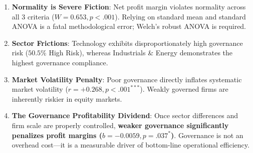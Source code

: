 \documentclass[
]{article}
\providecommand{\tightlist}{%
  \setlength{\itemsep}{0pt}\setlength{\parskip}{0pt}}
\begin{document}
\begin{enumerate}
\def\labelenumi{\arabic{enumi}.}
\tightlist
\item
  \textbf{Normality is Severe Fiction}: Net profit margin violates
  normality across all 3 criteria (\(W = 0.653, p < .001\)). Relying on
  standard mean and standard ANOVA is a fatal methodological error;
  Welch's robust ANOVA is required.
\item
  \textbf{Sector Frictions}: Technology exhibits disproportionately high
  governance risk (\(50.5\%\) High Risk), whereas Industrials \& Energy
  demonstrates the highest governance compliance.
\item
  \textbf{Market Volatility Penalty}: Poor governance directly inflates
  systematic market volatility (\(r = +0.268, p < .001^{***}\)). Weakly
  governed firms are inherently riskier in equity markets.
\item
  \textbf{The Governance Profitability Dividend}: Once sector
  differences and firm scale are properly controlled, \textbf{weaker
  governance significantly penalizes profit margins
  (\(b = -0.0059, p = .037^{*}\))}. Governance is not an overhead
  cost---it is a measurable driver of bottom-line operational
  efficiency.
\end{enumerate}
\end{document}

